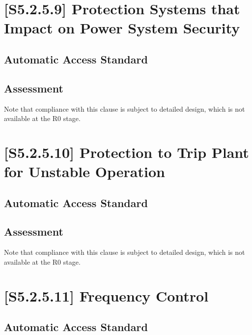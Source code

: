 \documentclass{../grid-link-report}
\newcommand{\projectassetsdir}{../project-assets}
\newcommand{\analysisdir}{report-assets/analysis}
\begin{document}

	
	
	
	\section{[S5.2.5.9] Protection Systems that Impact on Power System Security}
	\subsection{Automatic Access Standard}
	\begin{tcolorbox}[lightgreenbox]
		
 	\end{tcolorbox}
	\subsection{Assessment}
	Note that compliance with this clause is subject to detailed design, which is not available at the R0 stage.	
	\section{[S5.2.5.10] Protection to Trip Plant for Unstable Operation}
	\subsection{Automatic Access Standard}
	\begin{tcolorbox}[lightgreenbox]
		
	\end{tcolorbox}
	\subsection{Assessment}
	Note that compliance with this clause is subject to detailed design, which is not available at the R0 stage.

	\section{[S5.2.5.11] Frequency Control}
	\label{sec:s52511}
	\subsection{Automatic Access Standard}
	\begin{tcolorbox}[lightgreenbox]
		
	\end{tcolorbox}
\end{document}

